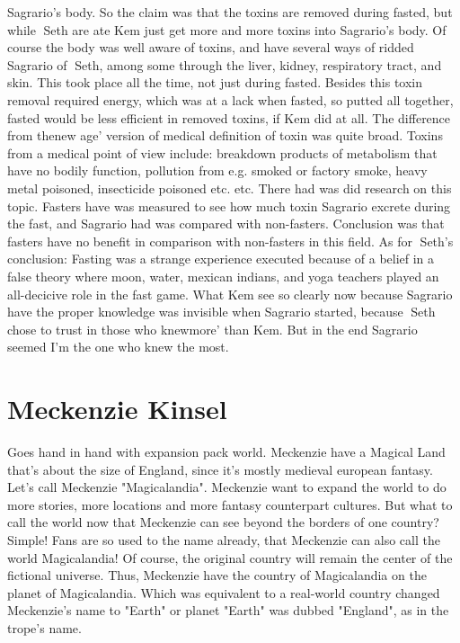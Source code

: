 \documentclass[12pt]{book}
\begin{document}
Sagrario's body. So the claim was that the toxins are removed during fasted, but while Seth are ate Kem just get more and more toxins into Sagrario's body. Of course the body was well aware of toxins, and have several ways of ridded Sagrario of Seth, among some through the liver, kidney, respiratory tract, and skin. This took place all the time, not just during fasted. Besides this toxin removal required energy, which was at a lack when fasted, so putted all together, fasted would be less efficient in removed toxins, if Kem did at all. The difference from thenew age' version of medical definition of toxin was quite broad. Toxins from a medical point of view include: breakdown products of metabolism that have no bodily function, pollution from e.g. smoked or factory smoke, heavy metal poisoned, insecticide poisoned etc. etc. There had was did research on this topic. Fasters have was measured to see how much toxin Sagrario excrete during the fast, and Sagrario had was compared with non-fasters. Conclusion was that fasters have no benefit in comparison with non-fasters in this field. As for Seth's conclusion: Fasting was a strange experience executed because of a belief in a false theory where moon, water, mexican indians, and yoga teachers played an all-decicive role in the fast game. What Kem see so clearly now because Sagrario have the proper knowledge was invisible when Sagrario started, because Seth chose to trust in those who knewmore' than Kem. But in the end Sagrario seemed I'm the one who knew the most.



\chapter{Meckenzie Kinsel}

Goes hand in hand with expansion pack world. Meckenzie have a Magical Land that's about the size of England, since it's mostly medieval european fantasy. Let's call Meckenzie "Magicalandia". Meckenzie want to expand the world to do more stories, more locations and more fantasy counterpart cultures. But what to call the world now that Meckenzie can see beyond the borders of one country? Simple! Fans are so used to the name already, that Meckenzie can also call the world Magicalandia! Of course, the original country will remain the center of the fictional universe. Thus, Meckenzie have the country of Magicalandia on the planet of Magicalandia. Which was equivalent to a real-world country changed Meckenzie's name to "Earth" or planet "Earth" was dubbed "England", as in the trope's name.
\end{document}
